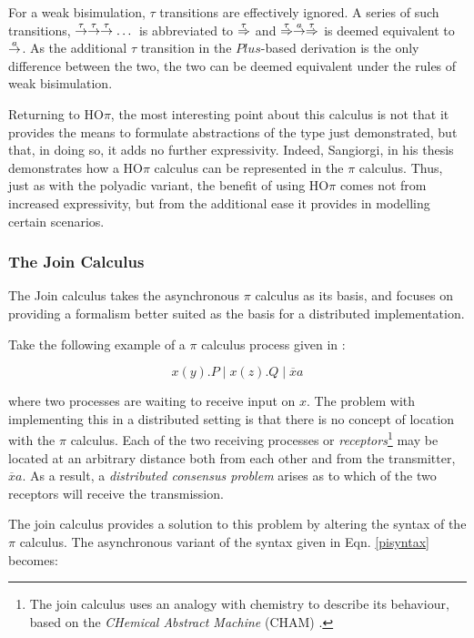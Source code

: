 For a weak bisimulation, $\tau$ transitions are effectively ignored.
A series of such transitions,
$\stackrel{\tau}{\rightarrow}\stackrel{\tau}{\rightarrow}\stackrel{\tau}{\rightarrow}\dots$ is abbreviated to
$\stackrel{\tau}{\Rightarrow}$ and $\stackrel{\tau}{\Rightarrow} \stackrel{a}{\rightarrow}
\stackrel{\tau}{\Rightarrow}$ is deemed equivalent to $\stackrel{a}{\rightarrow}$.  As the
additional $\tau$ transition in the $Plus$-based derivation is the
only difference between the two, the two can be deemed equivalent
under the rules of weak bisimulation.

Returning to HO$\pi$, the most interesting point about this calculus
is not that it provides the means to formulate abstractions of the
type just demonstrated, but that, in doing so, it adds no further
expressivity.  Indeed, Sangiorgi, in his thesis \cite{sangiorgi:phd}
demonstrates how a HO$\pi$ calculus can be represented in the $\pi$
calculus.  Thus, just as with the polyadic variant, the benefit of
using HO$\pi$ comes not from increased expressivity, but from the
additional ease it provides in modelling certain scenarios.

\subsubsection{The Join Calculus}
\label{join}

The Join calculus \cite{join} takes the asynchronous $\pi$ calculus as
its basis, and focuses on providing a formalism better suited as the
basis for a distributed implementation.

Take the following example of a $\pi$ calculus process given in
\cite{joinresults}:

\begin{equation}
x(y).P\;|\;x(z).Q\;|\;\overline{x}a
\end{equation}

\noindent where two processes are waiting to receive input on $x$.
The problem with implementing this in a distributed setting is that
there is no concept of location with the $\pi$ calculus.  Each of the
two receiving processes or \emph{receptors}\footnote{The join calculus
  uses an analogy with chemistry to describe its behaviour, based on
  the \emph{CHemical Abstract Machine} (CHAM) \cite{cham}.} may be
located at an arbitrary distance both from each other and from the
transmitter, $\overline{x}a$.  As a result, a \emph{distributed
  consensus problem} arises as to which of the two receptors will
receive the transmission.

The join calculus provides a solution to this problem by altering the
syntax of the $\pi$ calculus.  The asynchronous variant of the
syntax given in Eqn. \ref{pisyntax} becomes:

